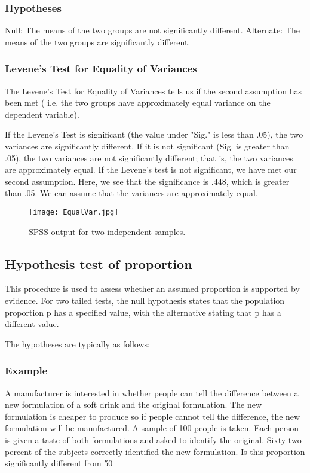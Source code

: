 \subsubsection{Hypotheses}
Null: The means of the two groups are not significantly different.
Alternate: The means of the two groups are significantly different.

\subsubsection{Levene's Test for Equality of Variances}
The Levene's Test for Equality of Variances  tells us if the second assumption has been met ( i.e. the two groups have approximately equal variance on the dependent variable).

If the Levene's Test is significant (the value under "Sig." is less than .05), the two variances are significantly different. If it is not significant (Sig. is greater than .05), the two variances are not significantly different; that is, the two variances are approximately equal. If the Levene's test is not significant, we have met our second assumption. Here, we see that the significance is .448, which is greater than .05. We can assume that the variances are approximately equal.


\begin{figure}[h!]
\begin{center}
  \texttt{[image: EqualVar.jpg]}
  \caption{SPSS output for two independent samples.}\label{EqualVar}
\end{center}
\end{figure}


\subsection{Hypothesis test of proportion}
This procedure is used to assess whether an assumed proportion is supported by evidence. For two tailed tests, the null hypothesis states that the population proportion  p has a specified value, with the alternative stating that p has a different value.

The hypotheses are typically as follows:

\subsubsection{Example}
A manufacturer is interested in whether people can tell the difference between a new formulation of a soft drink and the original formulation. The new formulation is cheaper to produce so if people cannot tell the difference, the new formulation will be manufactured. A sample of 100 people is taken. Each person is given a taste of both formulations and asked to identify the original. Sixty-two percent of the subjects correctly identified the new formulation. Is this proportion significantly different from 50%

